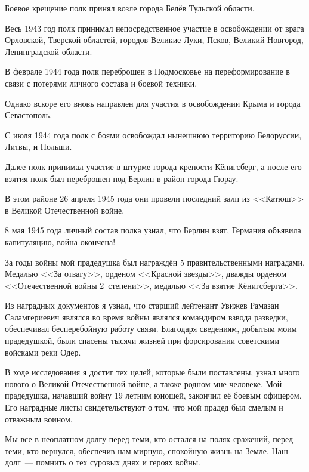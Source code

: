 Боевое крещение полк принял возле города Белёв Тульской области.

Весь 1943 год полк принимал непосредственное участие в освобождении от врага Орловской, Тверской областей, городов Великие Луки, Псков, Великий Новгород, Ленинградской области.

В феврале 1944 года полк переброшен в Подмосковье на переформирование в связи с потерями личного состава и боевой техники.

Однако вскоре его вновь направлен для участия в освобождении Крыма и города Севастополь.

С июля 1944 года полк с боями освобождал нынешнюю территорию Белоруссии, Литвы, и Польши.

Далее полк принимал участие в штурме города-крепости Кёнигсберг, а после его взятия полк был переброшен под Берлин в район города Гюрау.

В этом районе 26 апреля 1945 года они провели последний залп из <<Катюш>> в Великой Отечественной войне.

8 мая 1945 года личный состав полка узнал, что Берлин взят, Германия объявила капитуляцию, война окончена!

За годы войны мой прадедушка был награждён 5 правительственными наградами. Медалью <<За отвагу>>, орденом <<Красной звезды>>, дважды орденом <<Отечественной войны 2~степени>>, медалью <<За взятие Кёнигсберга>>.

Из наградных документов я узнал, что старший лейтенант Увижев Рамазан Саламгериевич являлся во время войны являлся командиром взвода разведки, обеспечивал бесперебойную работу связи. Благодаря сведениям, добытым моим прадедушкой, были спасены тысячи жизней при форсировании советскими войсками реки Одер.

В ходе исследования я достиг тех целей, которые были поставлены, узнал много нового о Великой Отечественной войне, а также родном мне человеке. Мой прадедушка, начавший войну 19 летним юношей, закончил её боевым офицером. Его наградные листы свидетельствуют о том, что мой прадед был смелым и отважным воином.

Мы все в неоплатном долгу перед теми, кто остался на полях сражений, перед теми, кто вернулся, обеспечив нам мирную, спокойную жизнь на Земле. Наш долг~--- помнить о тех суровых днях и героях войны.
